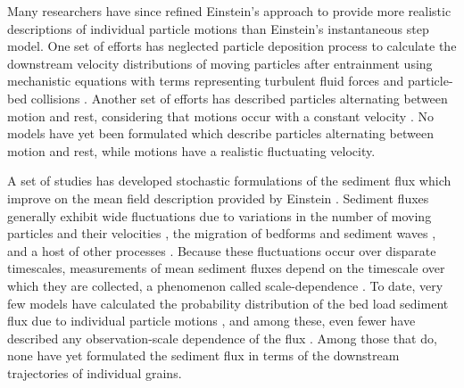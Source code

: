 Many researchers have since refined Einstein's approach to provide more realistic descriptions of individual particle motions than Einstein's instantaneous step model.
One set of efforts has neglected particle deposition process to calculate the downstream velocity distributions of moving particles after entrainment using mechanistic equations with terms representing turbulent fluid forces and particle-bed collisions \citep{Ancey2014,Fan2014}. 
Another set of efforts has described particles alternating between motion and rest, considering that motions occur with a constant velocity \citep{Lisle1998,Lajeunesse2017,Pierce2020b}. 
No models have yet been formulated which describe particles alternating between motion and rest, while motions have a realistic fluctuating velocity.

A set of studies has developed stochastic formulations of the sediment flux which improve on the mean field description provided by Einstein \citep{Furbish2012}. 
Sediment fluxes generally exhibit wide fluctuations due to variations in the number of moving particles and their velocities \citep{Ancey2008,Ancey2014}, the migration of bedforms and sediment waves \citep{Hamamori1962,Guala2014,Hoey1992,Recking2012}, and a host of other processes \citep{Dhont2018}.
Because these fluctuations occur over disparate timescales, measurements of mean sediment fluxes depend on the timescale over which they are collected, a phenomenon called scale-dependence \citep{Saletti2014,Dhont2019,Singh2009,Turowski2010,Ancey2020}.
To date, very few models have calculated the probability distribution of the bed load sediment flux due to individual particle motions \citep{Ancey2008,Ancey2014}, and among these, even fewer have described any observation-scale dependence of the flux \citep{Ancey2020,Turowski2010}. Among those that do, none have yet formulated the sediment flux in terms of the downstream trajectories of individual grains.

